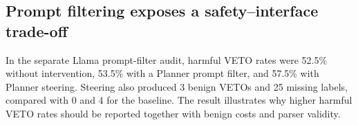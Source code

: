 \subsection{Prompt filtering exposes a safety--interface trade-off}
In the separate Llama prompt-filter audit, harmful VETO rates were 52.5\% without intervention, 53.5\% with a Planner prompt filter, and 57.5\% with Planner steering. Steering also produced 3 benign VETOs and 25 missing labels, compared with 0 and 4 for the baseline. The result illustrates why higher harmful VETO rates should be reported together with benign costs and parser validity.